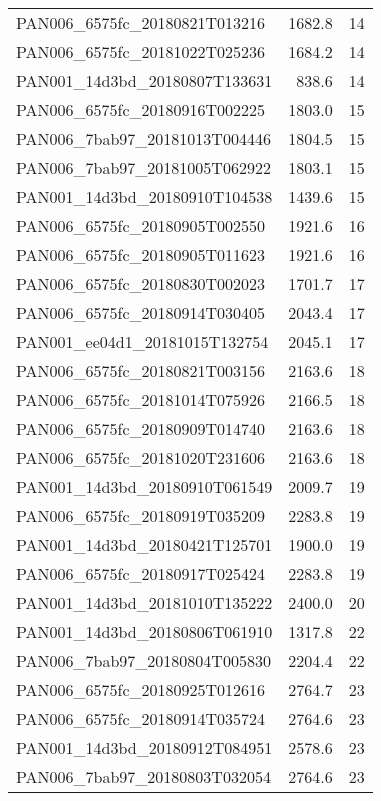 \begin{tabular}{lrr}
PAN006\_6575fc\_20180821T013216 &     1682.8 &       14 \\
PAN006\_6575fc\_20181022T025236 &     1684.2 &       14 \\
PAN001\_14d3bd\_20180807T133631 &      838.6 &       14 \\
PAN006\_6575fc\_20180916T002225 &     1803.0 &       15 \\
PAN006\_7bab97\_20181013T004446 &     1804.5 &       15 \\
PAN006\_7bab97\_20181005T062922 &     1803.1 &       15 \\
PAN001\_14d3bd\_20180910T104538 &     1439.6 &       15 \\
PAN006\_6575fc\_20180905T002550 &     1921.6 &       16 \\
PAN006\_6575fc\_20180905T011623 &     1921.6 &       16 \\
PAN006\_6575fc\_20180830T002023 &     1701.7 &       17 \\
PAN006\_6575fc\_20180914T030405 &     2043.4 &       17 \\
PAN001\_ee04d1\_20181015T132754 &     2045.1 &       17 \\
PAN006\_6575fc\_20180821T003156 &     2163.6 &       18 \\
PAN006\_6575fc\_20181014T075926 &     2166.5 &       18 \\
PAN006\_6575fc\_20180909T014740 &     2163.6 &       18 \\
PAN006\_6575fc\_20181020T231606 &     2163.6 &       18 \\
PAN001\_14d3bd\_20180910T061549 &     2009.7 &       19 \\
PAN006\_6575fc\_20180919T035209 &     2283.8 &       19 \\
PAN001\_14d3bd\_20180421T125701 &     1900.0 &       19 \\
PAN006\_6575fc\_20180917T025424 &     2283.8 &       19 \\
PAN001\_14d3bd\_20181010T135222 &     2400.0 &       20 \\
PAN001\_14d3bd\_20180806T061910 &     1317.8 &       22 \\
PAN006\_7bab97\_20180804T005830 &     2204.4 &       22 \\
PAN006\_6575fc\_20180925T012616 &     2764.7 &       23 \\
PAN006\_6575fc\_20180914T035724 &     2764.6 &       23 \\
PAN001\_14d3bd\_20180912T084951 &     2578.6 &       23 \\
PAN006\_7bab97\_20180803T032054 &     2764.6 &       23 \\

\end{tabular}
